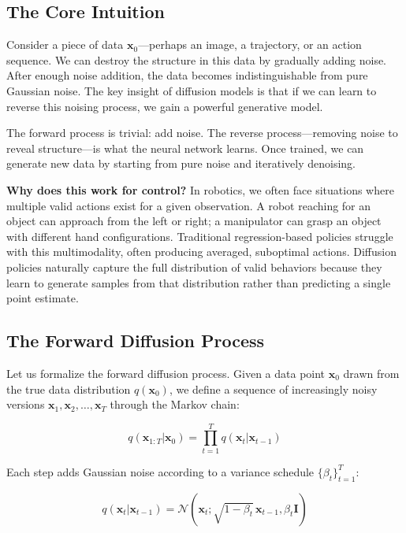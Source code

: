 \subsection{The Core Intuition}
\label{subsec:diffusion_intuition}

Consider a piece of data $\mathbf{x}_0$---perhaps an image, a trajectory, or an action sequence. We can destroy the structure in this data by gradually adding noise. After enough noise addition, the data becomes indistinguishable from pure Gaussian noise. The key insight of diffusion models is that if we can learn to reverse this noising process, we gain a powerful generative model.

The forward process is trivial: add noise. The reverse process---removing noise to reveal structure---is what the neural network learns. Once trained, we can generate new data by starting from pure noise and iteratively denoising.

\textbf{Why does this work for control?} In robotics, we often face situations where multiple valid actions exist for a given observation. A robot reaching for an object can approach from the left or right; a manipulator can grasp an object with different hand configurations. Traditional regression-based policies struggle with this multimodality, often producing averaged, suboptimal actions. Diffusion policies naturally capture the full distribution of valid behaviors because they learn to generate samples from that distribution rather than predicting a single point estimate.

\subsection{The Forward Diffusion Process}
\label{subsec:forward_process}

Let us formalize the forward diffusion process. Given a data point $\mathbf{x}_0$ drawn from the true data distribution $q(\mathbf{x}_0)$, we define a sequence of increasingly noisy versions $\mathbf{x}_1, \mathbf{x}_2, \ldots, \mathbf{x}_T$ through the Markov chain:

\begin{equation}
q(\mathbf{x}_{1:T} | \mathbf{x}_0) = \prod_{t=1}^{T} q(\mathbf{x}_t | \mathbf{x}_{t-1})
\label{eq:forward_chain}
\end{equation}

Each step adds Gaussian noise according to a variance schedule $\{\beta_t\}_{t=1}^{T}$:

\begin{equation}
q(\mathbf{x}_t | \mathbf{x}_{t-1}) = \mathcal{N}\left(\mathbf{x}_t; \sqrt{1-\beta_t}\,\mathbf{x}_{t-1}, \beta_t \mathbf{I}\right)
\label{eq:forward_step}
\end{equation}


